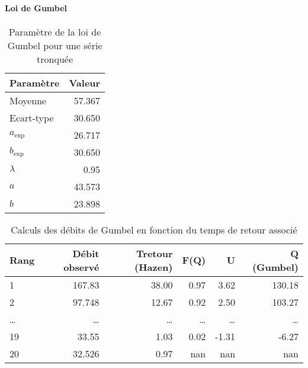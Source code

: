 \paragraph{Loi de Gumbel}
\begin{table}[H]
    \centering
    \begin{tabular}{l|r}
        \hline
        \textbf{Paramètre} & \textbf{Valeur} \\
        \hline
        Moyenne            & 57.367          \\
        Ecart-type         & 30.650          \\
        \hline
        $a_\text{exp}$     & 26.717          \\
        $b_\text{exp}$     & 30.650          \\
        \hline
        $\lambda$          & 0.95            \\
        $a$                & 43.573          \\
        $b$                & 23.898          \\
        \hline
    \end{tabular}
    \caption{Paramètre de la loi de Gumbel pour une série tronquée}
    \label{tab:param_Gumbel_tronquees2}
\end{table}

\begin{table}[H]
    \centering
    \begin{tabular}{l|r|r|r|r|r}
        \hline
        \textbf{Rang} & \textbf{Débit observé} & \textbf{Tretour (Hazen)} & \textbf{F(Q)} & \textbf{U} & \textbf{Q (Gumbel)} \\
        \hline
        1             & 167.83                 & 38.00                    & 0.97          & 3.62       & 130.18              \\
        2             & 97.748                 & 12.67                    & 0.92          & 2.50       & 103.27              \\
        \dots         & \dots                  & \dots                    & \dots         & \dots      & \dots               \\
        19            & 33.55                  & 1.03                     & 0.02          & -1.31      & -6.27               \\
        20            & 32.526                 & 0.97                     & nan           & nan        & nan                 \\
        \hline
    \end{tabular}
    \caption{Calculs des débits de Gumbel en fonction du temps de retour associé}
    \label{tab:gumbelcalcul_tronquees}
\end{table}

